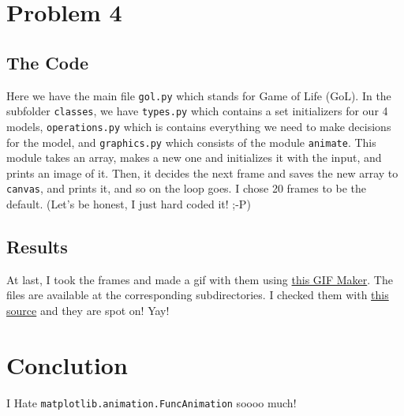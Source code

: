 \documentclass[12pt]{article}
\begin{document}
	\section{Problem 4}
	\subsection{The Code}
	Here we have the main file \texttt{gol.py} which stands for Game of Life (GoL).
	In the subfolder \texttt{classes}, we have \texttt{types.py} which contains a set initializers for our 4 models, \texttt{operations.py} which is contains everything
	we need to make decisions for the model, and \texttt{graphics.py} which consists of 
	the module \texttt{animate}. This module takes an array, makes a new one and initializes 
	it with the input, and prints an image of it. Then, it decides the next frame and saves the
	new array to \texttt{canvas}, and prints it, and so on the loop goes. I chose 20 frames to be the default. (Let's be honest, I just hard coded it! ;-P)
	\subsection{Results}
	At last, I took the frames and made a gif with them using \href{https://ezgif.com/maker}{this GIF Maker}. The files are available at the
	 corresponding subdirectories. I checked them with
	  \href{https://www.conwaylife.com/wiki/Main_Page}{this source} and 
	 they are spot on! Yay!
	 
	 
	 \section{Conclution}
	 I Hate \texttt{matplotlib.animation.FuncAnimation} soooo much!
	
	
\end{document}
